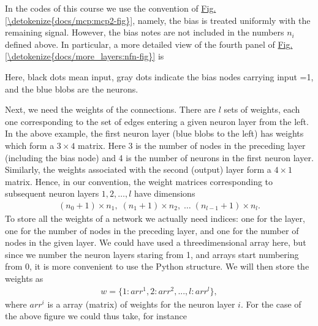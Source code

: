 \documentclass[letterpaper,10pt,english]{jupyterBook}
\begin{document}
\begin{sphinxVerbatim}[commandchars=\\\{\}]
[2, 4, 1]
\end{sphinxVerbatim}

\sphinxAtStartPar
In the codes of this course we use the convention of \hyperref[\detokenize{docs/mcp:mcp2-fig}]{Fig.\@ \ref{\detokenize{docs/mcp:mcp2-fig}}}, namely, the bias is treated uniformly with the remaining signal. However, the bias notes are not included in the numbers \(n_i\) defined above. In particular, a more detailed view of the fourth panel of \hyperref[\detokenize{docs/more_layers:nfn-fig}]{Fig.\@ \ref{\detokenize{docs/more_layers:nfn-fig}}} is

\begin{sphinxVerbatim}[commandchars=\\\{\}]
\end{sphinxVerbatim}

\noindent{}

\sphinxAtStartPar
Here, black dots mean input, gray dots indicate the bias nodes carrying input =1, and the blue blobs are the neurons.

\sphinxAtStartPar
Next, we need the weights of the connections. There are \(l\) sets of weights, each one corresponding to the set of edges entering a given neuron layer from the left.
In the above example, the first neuron layer (blue blobs to the left) has weights which form a \(3 \times 4\) matrix. Here 3 is the number of nodes in the preceding layer (including the bias node) and 4 is the number of neurons in the first neuron layer. Similarly, the weights associated with the second (output) layer form a \(4 \times 1\) matrix. Hence, in our convention, the weight matrices corresponding to subsequent neuron layers \(1, 2, \dots, l\) have dimensions
\begin{equation*}
\begin{split}
(n_0+1)\times n_1, \; (n_1+1)\times n_2, \; \dots \; (n_{l-1}+1)\times n_l.
\end{split}
\end{equation*}
\sphinxAtStartPar
To store all the weights of a network we actually need  indices: one for the layer, one for the number of nodes in the preceding layer, and one for the number of nodes in the given layer. We could have used a three\sphinxhyphen{}dimensional array here, but since we number the neuron layers staring from 1, and arrays start numbering from 0, it is more convenient to use the Python  structure. We will then store the weights as
\begin{equation*}
\begin{split}w=\{1: arr^1, 2: arr^2, ..., l: arr^l\},\end{split}
\end{equation*}
\sphinxAtStartPar
where \(arr^i\) is a  array (matrix) of weights for the neuron layer \(i\). For the case of the above figure we could thus take, for instance
\end{document}
